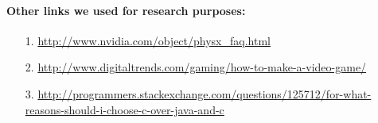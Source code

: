 \paragraph{\bfseries Other links we used for research purposes:}

\begin{itemize}
    \item[1.]{}{ \url{http://www.nvidia.com/object/physx_faq.html}}
    \item[2.]{}{ \url{http://www.digitaltrends.com/gaming/how-to-make-a-video-game/}}
    \item[3.]{}{ \url{http://programmers.stackexchange.com/questions/125712/for-what-reasons-should-i-choose-c-over-java-and-c}}
\end{itemize}




